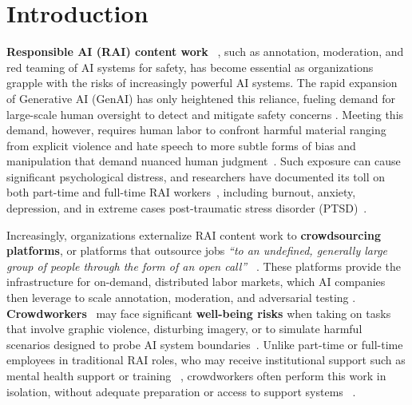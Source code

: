 \section{Introduction}

\textbf{Responsible AI (RAI) content work} ~\cite{qian2025aura}, such as annotation, moderation, and red teaming of AI systems for safety, has become essential as organizations grapple with the risks of increasingly powerful AI systems. The rapid expansion of Generative AI (GenAI) has only heightened this reliance, fueling demand for large-scale human oversight to detect and mitigate safety concerns \cite{StanfordHAI2025AIIndex, GrandViewResearch2024GenerativeAI}. %
Meeting this demand, however, requires human labor to confront harmful material ranging from explicit violence and hate speech to more subtle forms of bias and manipulation that demand nuanced human judgment~\cite{qian2025aura}. Such exposure can cause significant psychological distress, and researchers have documented its toll on both part-time and full-time RAI workers~\cite{roberts2016commercial, qian2025aura}, including burnout, anxiety, depression, and in extreme cases post-traumatic stress disorder (PTSD)~\cite{alemadi2024emotional, martinez2024secondary, spence2025content, gebrekidan2024content}.

Increasingly, organizations externalize RAI content work to \textbf{crowdsourcing platforms}, or platforms that outsource jobs \textit{``to an undefined, generally large group of people through the form of an open call''} ~\cite{howe2006rise, berg2018digital}. These platforms provide the infrastructure for  on-demand, distributed labor markets, which AI companies then leverage to scale annotation, moderation, and adversarial testing \cite{udupa2023ethical, mann2025meta, egelman2014crowdsourcing}.
\textbf{Crowdworkers}~\cite{berg2018digital} may face significant \textbf{well-being risks} when taking on tasks that involve graphic violence, disturbing imagery, or to simulate harmful scenarios designed to probe AI system boundaries~\cite{qian2025locating}. 
Unlike part-time or full-time employees in traditional RAI roles, who may receive institutional support such as mental health support or training ~\cite{qian2025aura, roberts2016commercial, steiger_psychological_2021}, crowdworkers often perform this work in isolation, without adequate preparation or access to support systems ~\cite{schlicher2021flexible, berastegui2021exposure}. 



